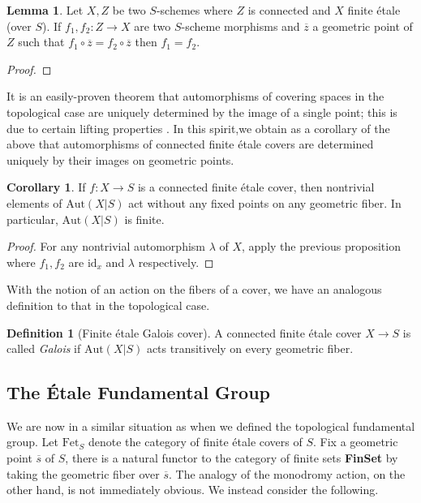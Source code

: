 \documentclass{article}
\theoremstyle{definition}
\newtheorem{lemma}[theorem]{Lemma}
\newtheorem{corollary}[theorem]{Corollary}
\newtheorem{definition}[theorem]{Definition}
\theoremstyle{remark}
\begin{document}
\begin{lemma}
	Let $X, Z$ be two $S$-schemes where $Z$ is connected and $X$ finite \'etale (over $S$). 
	If $f_1, f_2: Z \to X$ are two $S$-scheme morphisms and $\overline{z}$ a geometric point of $Z$  such that $f_1 \circ \overline{z} = f_2 \circ \overline{z}$ then $f_1 = f_2$.
\end{lemma}

\begin{proof}
\end{proof}

It is an easily-proven theorem that automorphisms of covering spaces in the topological case are uniquely determined by the image of a single point; this is due to certain lifting properties .
In this spirit,we obtain as a corollary of the above that automorphisms of connected finite \'etale covers are determined uniquely by their images on geometric points.
\begin{corollary}
	If $f: X \to S$ is a connected finite \'etale cover, then nontrivial elements of $\text{Aut}(X|S)$ act without any fixed points on any geometric fiber.
	In particular, $\text{Aut}(X|S)$ is finite.
\end{corollary}

\begin{proof}
	For any nontrivial automorphism $\lambda$ of $X$, apply the previous proposition where $f_1, f_2$ are $\text{id}_x$ and $\lambda$ respectively.
\end{proof}

With the notion of an action on the fibers of a cover, we have an analogous definition to that in the topological case.

\begin{definition}[Finite \'etale Galois cover]
	A connected finite \'etale cover $X \to S$ is called \textit{Galois} if $\text{Aut}(X|S)$ acts transitively on every geometric fiber.
\end{definition}


\subsection{The \'Etale Fundamental Group}


We are now in a similar situation as when we defined the topological fundamental group.
Let $\text{Fet}_S$ denote the category of finite \'etale covers of $S$.
Fix a geometric point $\overline{s}$ of $S$, there is a natural functor to the category of finite sets \textbf{FinSet} by taking the geometric fiber over $\overline{s}$. 
The analogy of the monodromy action, on the other hand, is not immediately obvious.
We instead consider the following.
\end{document}
